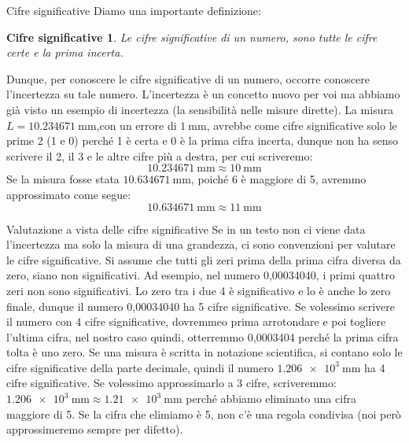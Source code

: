 \documentclass[12pt,a4paper,oneside]{book}
\makeatletter
\newtheorem{csf}{Cifre significative}
\renewcommand{\section}{\@startsection{section}{1}{\z@}
{-4ex \@plus -1ex \@minus -.4ex}
{1ex \@plus.2ex }
{\normalfont\large\sffamily\bfseries}}
\renewcommand{\subsection}{\@startsection {subsection}{2}{\z@}
{-3ex \@plus -0.1ex \@minus -.4ex}
{0.5ex \@plus.2ex }
{\color[rgb]{0.141,0.596,0.749}\normalfont\sffamily\bfseries}}
\theoremstyle{esercizio}
\makeatother
\begin{document}
\section{Cifre significative}
	Diamo una importante definizione:
\begin{csf}
	Le cifre significative di un numero, sono tutte le cifre certe e la prima incerta.
\end{csf}
Dunque, per conoscere le cifre significative di un numero, occorre conoscere l'incertezza su tale numero. L'incertezza è un concetto nuovo per voi ma abbiamo già visto un esempio di incertezza (la sensibilità nelle misure dirette). La misura $L = \SI{10,234671}{\milli\meter}$,con un errore di $\SI{1}{\milli\meter}$, avrebbe come cifre significative solo le prime 2 (1 e 0) perché 1 è certa e 0 è la prima cifra incerta, dunque non ha senso scrivere il 2, il 3 e le altre cifre più a destra, per cui scriveremo:
\[
\SI{10,234671}{\milli\meter} \approx \SI{10}{\milli\meter}
\]
Se la misura fosse stata $\SI{10,634671}{\milli\meter}$, poiché 6 è maggiore di 5, avremmo approssimato come segue:
\[
\SI{10,634671}{\milli\meter} \approx \SI{11}{\milli\meter}
\]
\subsection{Valutazione a vista delle cifre significative}
Se in un testo non ci viene data l'incertezza ma solo la misura di una grandezza, ci sono convenzioni per valutare le cifre significative. Si assume che tutti gli zeri prima della prima cifra diversa da zero, siano non significativi. Ad esempio, nel numero 0,00034040, i primi quattro zeri non sono significativi. Lo zero tra i due 4 è significativo e lo è anche lo zero finale, dunque il numero 0,00034040 ha 5 cifre significative. Se volessimo scrivere il numero con 4 cifre significative, dovremmeo prima arrotondare e poi togliere l'ultima cifra, nel nostro caso quindi, otterremmo 0,0003404 perché la prima cifra tolta è uno zero. Se una misura è scritta in notazione scientifica, si contano solo le cifre significative della parte decimale, quindi il numero $\SI{1,206e+3}{\milli\meter}$ ha 4 cifre significative. Se volessimo approssimarlo a 3 cifre, scriveremmo: $\SI{1,206e+3}{\milli\meter} \approx \SI{1,21e+3}{\milli\meter}$ perché abbiamo eliminato una cifra maggiore di 5. Se la cifra che elimiamo è 5, non c'è una regola condivisa (noi però approssimeremo sempre per difetto).
\end{document}

